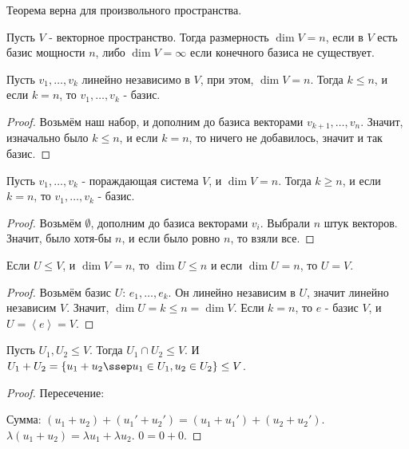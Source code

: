 \begin{remark} \thmslashn

    Теорема верна для произвольного пространства.
\end{remark}
\begin{definition} \thmslashn 

    Пусть $V$ - векторное пространство. Тогда размерность $\dim V = n$, если в $V$ есть базис мощности $n$, либо $\dim V = \infty$ если конечного базиса не существует.
\end{definition}
\begin{lemma} \thmslashn

    Пусть $v_1, \ldots,  v_{k}$ линейно независимо в $V$, при этом, $\dim V =n$. Тогда $k \le n$, и если $k=n$, то $v_1, \ldots, v_{k}$ - базис.
    \begin{proof}
        Возьмём наш набор, и дополним до базиса векторами $v_{k+1}, \ldots, v_{n}$. Значит, изначально было $k\le n$, и если $k=n$, то ничего не добавилось, значит и так базис.
    \end{proof}
\end{lemma}
\begin{lemma} \thmslashn

    Пусть $v_1, \ldots, v_{k}$ - пораждающая система $V$, и $\dim V = n$. Тогда $k \ge n$, и если $k=n$, то $v_1, \ldots, v_{k}$ - базис.
    \begin{proof}
        Возьмём $ \emptyset$, дополним до базиса векторами $v_{i}$. Выбрали $n$ штук векторов. Значит, было хотя-бы $n$, и если было ровно $n$, то взяли все.
    \end{proof}
\end{lemma}
\begin{consequence} \thmslashn

    Если $U \le V$, и $\dim V = n$, то $\dim U \le n$ и если $\dim U = n$, то $U = V$.
    \begin{proof}
        Возьмём базис $U$: $e_1, \ldots, e_{k}$. Он линейно независим в $U$, значит линейно независим $V$. Значит, $\dim U = k \le n = \dim V $. Если $k=n$, то $e$ - базис $V$, и $U = \left<e\right> = V$.
    \end{proof}
\end{consequence}
\begin{statement} \thmslashn

    Пусть $U_1, U_2 \le V$. Тогда $U_1\cap U_2 \le V$. И $U_1 + U_2 = \{u_1 + u_2 \ssep u_1\in U_1, u_2\in U_2\} \le V$.
    \begin{proof} \thmslashn

        Пересечение: \TODO

        Сумма: $(u_1 + u_2) + (u_1' + u_2') = (u_1 + u_1') + (u_2 + u_2')$. $\lambda(u_1 + u_2) = \lambda u_1 + \lambda u_2$. $0 = 0 + 0$.
    \end{proof}
\end{statement}
